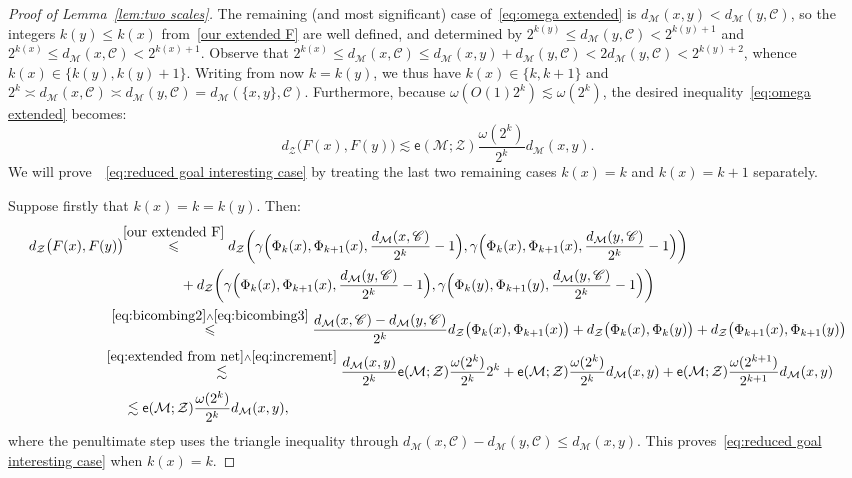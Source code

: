 \documentclass[11pt,reqno]{amsart}
\renewcommand{\le}{\leqslant}
\newcommand{\ee}{\mathsf{e}}
\newcommand{\cZ}{\mathcal{Z}}
\newcommand{\MM}{\mathcal{M}}
\newcommand{\sub}{\mathscr{C}}
\begin{document}
\begin{proof}[Proof of Lemma~\ref{lem:two scales}]
The remaining (and most significant) case of~\eqref{eq:omega extended} is  $d_\MM(x,y)< d_\MM(y,\sub)$, so the integers $k(y)\le k(x)$ from~\eqref{our extended F} are well defined, and  determined by $2^{k(y)}\le d_\MM(y,\sub)<2^{k(y)+1}$ and  $2^{k(x)}\le d_\MM(x,\sub)<2^{k(x)+1}$.  Observe that $2^{k(x)}\le d_\MM(x,\sub)\le d_\MM(x,y)+d_\MM(y,\sub)<2d_\MM(y,\sub)<2^{k(y)+2}$, whence  $k(x)\in \{k(y),k(y)+1\}$. Writing from now $k=k(y)$, we thus have $k(x)\in \{k,k+1\}$  and $2^{k}\asymp d_\MM(x,\sub)\asymp d_\MM(y,\sub)=d_\MM(\{x,y\},\sub)$. Furthermore, because $\omega(O(1)2^k)\lesssim \omega(2^k)$, the desired inequality~\eqref{eq:omega extended} becomes:
\begin{equation}\label{eq:reduced goal interesting case}
 d_\cZ\big(F(x),F(y)\big)\lesssim \ee(\MM;\cZ)\frac{\omega(2^k)}{2^k}d_\MM(x,y). 
\end{equation}
We will prove~~\eqref{eq:reduced goal interesting case}  by treating the last two remaining cases $k(x)=k$ and $k(x)=k+1$ separately. 


Suppose firstly that $k(x)=k=k(y)$. Then: 
\begin{align*}
d_\cZ\big(F(x),F(y)\big) &\!\!\stackrel{\eqref{our extended F}}{\le} d_\cZ\bigg(\gamma\Big(\Phi_{k}(x),\Phi_{k +1}(x),\frac{d_\MM(x,\sub)}{2^{k}}-1\Big),\gamma\Big(\Phi_{k}(x),\Phi_{k +1}(x),\frac{d_\MM(y,\sub)}{2^{k}}-1\Big)\bigg)\\&\qquad\qquad +d_\cZ\bigg(\gamma\Big(\Phi_{k}(x),\Phi_{k +1}(x),\frac{d_\MM(y,\sub)}{2^{k}}-1\Big),\gamma\Big(\Phi_{k}(y),\Phi_{k +1}(y),\frac{d_\MM(y,\sub)}{2^{k}}-1\Big)\bigg)\\
&\!\!\!\!\!\!\!\stackrel{\eqref{eq:bicombing2}\wedge\eqref{eq:bicombing3}}{\le} \frac{d_\MM(x,\sub)-d_\MM(y,\sub)}{2^k}d_\cZ\big(\Phi_k(x),\Phi_{k+1}(x)\big)+d_\cZ\big(\Phi_k(x),\Phi_k(y)\big)+
d_\cZ\big(\Phi_{k+1}(x),\Phi_{k+1}(y)\big)\\&\!\!\!\!\!\!\!\!\!\stackrel{\eqref{eq:extended from net}\wedge \eqref{eq:increment}}{\lesssim}
\frac{d_\MM(x,y)}{2^k}\ee(\MM;\cZ)\frac{\omega(2^k)}{2^k} 2^k+
\ee(\MM;\cZ)\frac{\omega(2^k)}{2^k}d_\MM(x,y)+\ee(\MM;\cZ)\frac{\omega(2^{k+1})}{2^{k+1}}d_\MM(x,y)\\&\lesssim \ee(\MM;\cZ)\frac{\omega(2^k)}{2^k}d_\MM(x,y),
\end{align*}
where the penultimate  step uses the triangle inequality through $d_\MM(x,\sub)-d_\MM(y,\sub)\le d_\MM(x,y)$. This proves~\eqref{eq:reduced goal interesting case} when $k(x)=k$. 


\end{proof}
\end{document}
